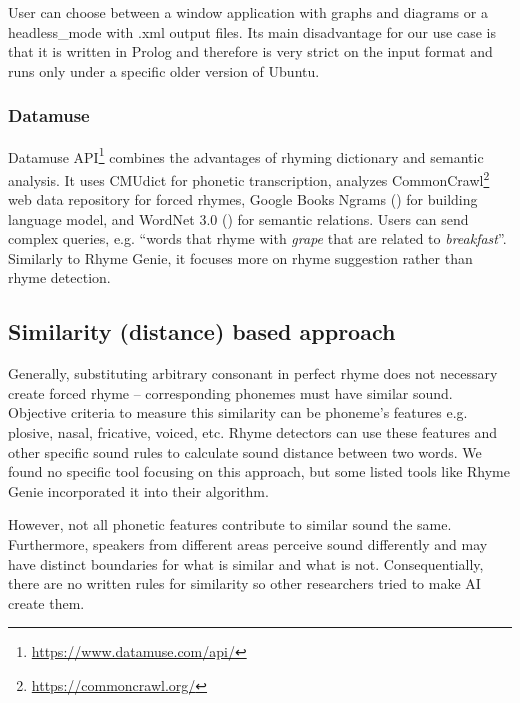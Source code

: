 User can choose between a window application with graphs and diagrams or a \gls{headless_mode} with .xml output files. Its main disadvantage for our use case is that it is written in Prolog and therefore is very strict on the input format and runs only under a specific older version of Ubuntu. 

\subsubsection*{Datamuse}
Datamuse API\footnote{\url{https://www.datamuse.com/api/}} combines the advantages of  rhyming dictionary and semantic analysis. It uses CMUdict for phonetic transcription, analyzes CommonCrawl\footnote{\url{https://commoncrawl.org/}} web data repository for forced rhymes, Google Books Ngrams (\cite{weiss2015google}) for building language model, and WordNet 3.0 (\cite{pearson2005encyclopedia}) for semantic relations. Users can send complex queries, e.g. ``words that rhyme with \textit{grape} that are related to \textit{breakfast}''. Similarly to Rhyme Genie, it focuses more on rhyme suggestion rather than rhyme detection.


\subsection{Similarity (distance) based approach}
Generally, substituting arbitrary consonant in perfect rhyme does not necessary create forced rhyme -- corresponding phonemes must have similar sound. Objective criteria to measure this similarity can be phoneme's features e.g. plosive, nasal, fricative, voiced, etc. Rhyme detectors can use these features and other specific sound rules to calculate sound distance between two words. We found no specific tool focusing on this approach, but some listed tools like Rhyme Genie incorporated it into their algorithm. 

However, not all phonetic features contribute to similar sound the same. Furthermore, speakers from different areas perceive sound differently and may have distinct boundaries for what is similar and what is not. Consequentially, there are no written rules for similarity so other researchers tried to make AI create them.

